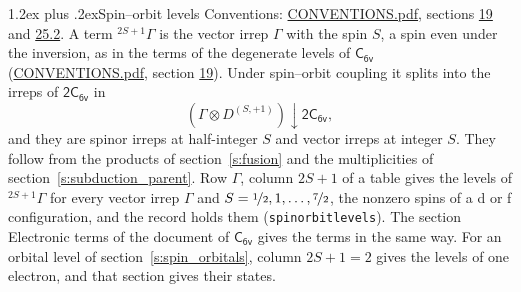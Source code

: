 \documentclass[10pt,a4paper]{article}
\makeatletter
\renewcommand\section{\@startsection{section}{1}{\z@}{-3ex plus -1ex minus -.2ex}%
  {1.2ex plus .2ex}{\normalfont\large\sffamily\bfseries\color{parttitle}}}
\numberwithin{equation}{section}
\newcommand{\grp}[1]{\mathsf{#1}}
\newcommand{\restr}[2]{#1\!\downarrow#2}
\newcommand{\irrJp}[2]{D^{(#1,#2)}}
\newcommand{\irrprod}{\otimes}
\newcommand{\term}[2]{{}^{#1}#2}
\makeatother
\begin{document}
\section{Spin--orbit levels}\label{s:spin_orbit}
Conventions: \href{../../CONVENTIONS.pdf}{CONVENTIONS.pdf}, sections \href{../../../rotation/CONVENTIONS.pdf\#conv.19}{19} and \href{../../CONVENTIONS.pdf\#conv.25.2}{25.2}.
\leavevmode\label{n:local.spin}\label{n:symbol.term}A term $\term{2S+1}{\Gamma}$ is the vector irrep $\Gamma$ with the spin $S$, a spin even under the inversion, as in the terms of the degenerate levels of \href{../../../rotation/data/pdf/C6v.pdf}{$\grp{C_{6v}}$} (\href{../../CONVENTIONS.pdf}{CONVENTIONS.pdf}, section \href{../../../rotation/CONVENTIONS.pdf\#conv.19}{19}). Under spin--orbit coupling it splits into the irreps of $\grp{2C_{6v}}$ in
\begin{equation}\label{e:spinorbit}\restr{(\Gamma \irrprod \irrJp{S}{+1})}{\grp{2C_{6v}}},\end{equation}
and they are spinor irreps at half-integer $S$ and vector irreps at integer $S$. They follow from the products of section~\ref{s:fusion} and the multiplicities of section~\ref{s:subduction_parent}. Row $\Gamma$, column $2S + 1$ of a table gives the levels of $\term{2S+1}{\Gamma}$ for every vector irrep $\Gamma$ and $S = \nicefrac{1}{2}, 1, \dots, \nicefrac{7}{2}$, the nonzero spins of a d or f configuration, and the record holds them (\texttt{spinorbitlevels}). The section Electronic terms of the document of \href{../../../rotation/data/pdf/C6v.pdf}{$\grp{C_{6v}}$} gives the terms in the same way. For an orbital level of section~\ref{s:spin_orbitals}, column $2S + 1 = 2$ gives the levels of one electron, and that section gives their states.
\end{document}
